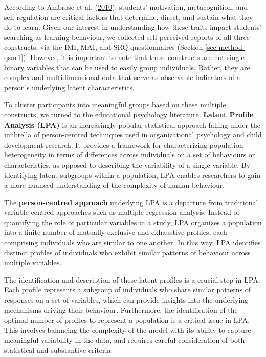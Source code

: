 \documentclass[letterpaper, nobind]{templates/ociamthesis}
\begin{document}
According to Ambrose et al. (\protect\hyperlink{ref-ambrose2010howa}{2010}), students' motivation, metacognition, and self-regulation are critical factors that determine, direct, and sustain what they do to learn.
Given our interest in understanding how these traits impact students' searching as learning behaviour, we collected self-perceived reports of all three constructs, via the IMI, MAI, and SRQ questionnaires (Section \ref{sec-method-qsnr1}).
However, it is important to note that these constructs are not single binary variables that can be used to easily group individuals. Rather, they are complex and multidimensional data that serve as observable indicators of a person's underlying latent characteristics.

To cluster participants into meaningful groups based on these multiple constructs, we turned to the educational psychology literature.
\textbf{Latent Profile Analysis (LPA)} is an increasingly popular statistical approach falling under the umbrella of person-centred techniques used in organizational psychology and child development research. It provides a framework for characterizing population heterogeneity in terms of differences across individuals on a set of behaviours or characteristics, as opposed to describing the variability of a single variable. By identifying latent subgroups within a population, LPA enables researchers to gain a more nuanced understanding of the complexity of human behaviour.

The \textbf{person-centred approach} underlying LPA is a departure from traditional variable-centred approaches such as multiple regression analysis. Instead of quantifying the role of particular variables in a study, LPA organizes a population into a finite number of mutually exclusive and exhaustive profiles, each comprising individuals who are similar to one another. In this way, LPA identifies distinct profiles of individuals who exhibit similar patterns of behaviour across multiple variables.

The identification and description of these latent profiles is a crucial step in LPA. Each profile represents a subgroup of individuals who share similar patterns of responses on a set of variables, which can provide insights into the underlying mechanisms driving their behaviour. Furthermore, the identification of the optimal number of profiles to represent a population is a critical issue in LPA. This involves balancing the complexity of the model with its ability to capture meaningful variability in the data, and requires careful consideration of both statistical and substantive criteria.
\end{document}
